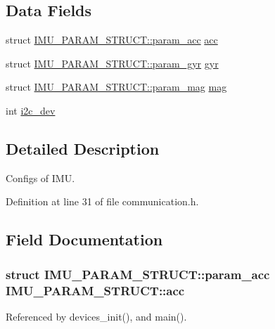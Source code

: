 \subsection*{Data Fields}
\begin{DoxyCompactItemize}
\item 
struct \hyperlink{structIMU__PARAM__STRUCT_1_1param__acc}{I\-M\-U\-\_\-\-P\-A\-R\-A\-M\-\_\-\-S\-T\-R\-U\-C\-T\-::param\-\_\-acc} \hyperlink{structIMU__PARAM__STRUCT_a92172e4757d0f8f9135a659e406c12e5}{acc}
\item 
struct \hyperlink{structIMU__PARAM__STRUCT_1_1param__gyr}{I\-M\-U\-\_\-\-P\-A\-R\-A\-M\-\_\-\-S\-T\-R\-U\-C\-T\-::param\-\_\-gyr} \hyperlink{structIMU__PARAM__STRUCT_a5a4557868f1af679a1098808397b02ec}{gyr}
\item 
struct \hyperlink{structIMU__PARAM__STRUCT_1_1param__mag}{I\-M\-U\-\_\-\-P\-A\-R\-A\-M\-\_\-\-S\-T\-R\-U\-C\-T\-::param\-\_\-mag} \hyperlink{structIMU__PARAM__STRUCT_a26b277dcaf05f3842995df888225f6f4}{mag}
\item 
int \hyperlink{structIMU__PARAM__STRUCT_a8a870f383fc9ba0b682fdc9b8c0d2734}{i2c\-\_\-dev}
\end{DoxyCompactItemize}


\subsection{Detailed Description}
Configs of I\-M\-U. 

Definition at line 31 of file communication.\-h.



\subsection{Field Documentation}
\hypertarget{structIMU__PARAM__STRUCT_a92172e4757d0f8f9135a659e406c12e5}{
\subsubsection[{acc}]{\setlength{\rightskip}{0pt plus 5cm}struct {\bf I\-M\-U\-\_\-\-P\-A\-R\-A\-M\-\_\-\-S\-T\-R\-U\-C\-T\-::param\-\_\-acc} I\-M\-U\-\_\-\-P\-A\-R\-A\-M\-\_\-\-S\-T\-R\-U\-C\-T\-::acc}}\label{structIMU__PARAM__STRUCT_a92172e4757d0f8f9135a659e406c12e5}


Referenced by devices\-\_\-init(), and main().

